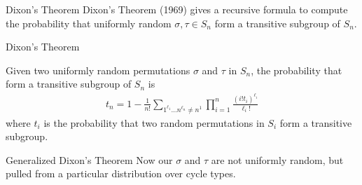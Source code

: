 \documentclass[hyphens,aspectratio=169]{beamer}
\begin{document}
\begin{frame}[fragile]{Dixon's Theorem}
	\large
	Dixon's Theorem (1969) gives a recursive formula to compute the probability that uniformly random $\sigma, \tau\in S_n$ form a transitive subgroup of $S_n$.
\end{frame}

\begin{frame}[fragile]{Dixon's Theorem}
	\begin{theorem}
		Given two uniformly random permutations $\sigma$ and $\tau$ in $S_n$, the
		probability that form a transitive subgroup of $S_n$ is
		\begin{align*}
			t_n = 1-\frac{1}{n!}\sum_{1^{\ell_1}\dots n^{\ell_n} \ne n^1}\prod_{i=1}^n{\frac{(i!t_{i})^{\ell_i}}{\ell_i!}}
		\end{align*}
		where $t_i$ is the probability that two random permutations in
		$S_i$ form a transitive subgroup.
	\end{theorem}

\end{frame}

\begin{frame}[fragile]{Generalized Dixon's Theorem}
	\large
	Now our $\sigma$ and $\tau$ are not uniformly random, but pulled from a particular distribution over cycle types.
\end{frame}
\end{document}
